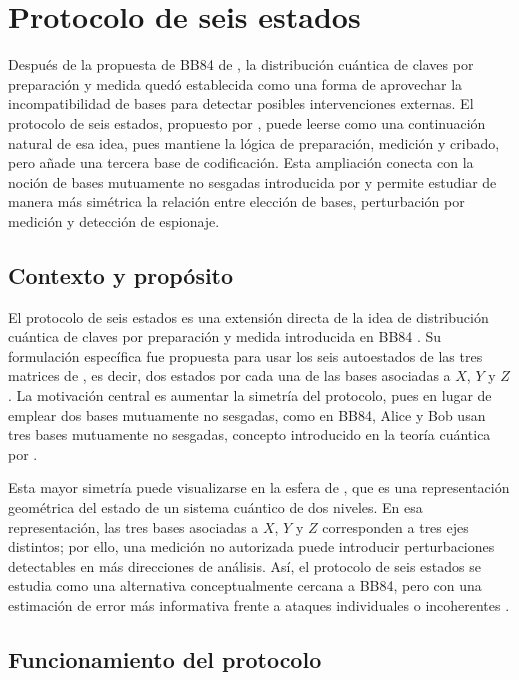 \section{Protocolo de seis estados}

Después de la propuesta de BB84 de \cite{bennett1984}, la distribución cuántica de claves por preparación y medida quedó establecida como una forma de aprovechar la incompatibilidad de bases para detectar posibles intervenciones externas. El protocolo de seis estados, propuesto por \cite{bruss1998}, puede leerse como una continuación natural de esa idea, pues mantiene la lógica de preparación, medición y cribado, pero añade una tercera base de codificación. Esta ampliación conecta con la noción de bases mutuamente no sesgadas introducida por \cite{schwinger1960} y permite estudiar de manera más simétrica la relación entre elección de bases, perturbación por medición y detección de espionaje.

\subsection{Contexto y propósito}

El protocolo de seis estados es una extensión directa de la idea de distribución cuántica de claves por preparación y medida introducida en BB84 \citep{bennett1984}. Su formulación específica fue propuesta para usar los seis autoestados de las tres matrices de \cite{pauli1927}, es decir, dos estados por cada una de las bases asociadas a $X$, $Y$ y $Z$ \citep{bruss1998}. La motivación central es aumentar la simetría del protocolo, pues en lugar de emplear dos bases mutuamente no sesgadas, como en BB84, Alice y Bob usan tres bases mutuamente no sesgadas, concepto introducido en la teoría cuántica por \cite{schwinger1960}.

Esta mayor simetría puede visualizarse en la esfera de \cite{bloch1946}, que es una representación geométrica del estado de un sistema cuántico de dos niveles. En esa representación, las tres bases asociadas a $X$, $Y$ y $Z$ corresponden a tres ejes distintos; por ello, una medición no autorizada puede introducir perturbaciones detectables en más direcciones de análisis. Así, el protocolo de seis estados se estudia como una alternativa conceptualmente cercana a BB84, pero con una estimación de error más informativa frente a ataques individuales o incoherentes \citep{bruss1998,bechmann1999}.

\subsection{Funcionamiento del protocolo}

